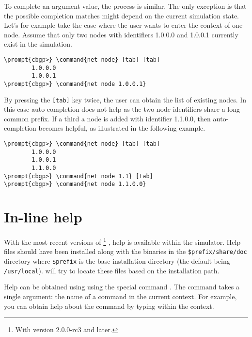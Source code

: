 To complete an argument value, the process is similar. The only
exception is that the possible completion matches might depend on the
current simulation state. Let's for example take the case where the
user wants to enter the context of one node. Assume that only two
nodes with identifiers 1.0.0.0 and 1.0.0.1 currently exist in the
simulation.

\begin{Verbatim}[commandchars=\\\{\}]
\prompt{cbgp>} \command{net node} [tab] [tab]
        1.0.0.0
        1.0.0.1
\prompt{cbgp>} \command{net node 1.0.0.1}
\end{Verbatim}

By pressing the \verb|[tab]| key twice, the user can
obtain the list of existing nodes. In this case auto-completion does
not help as the two node identifiers share a long common prefix. If a
third a node is added with identifier 1.1.0.0, then auto-completion
becomes helpful, as illustrated in the following example.

\begin{Verbatim}[commandchars=\\\{\}]
\prompt{cbgp>} \command{net node} [tab] [tab]
        1.0.0.0
        1.0.0.1
        1.1.0.0
\prompt{cbgp>} \command{net node 1.1} [tab]
\prompt{cbgp>} \command{net node 1.1.0.0}
\end{Verbatim}

\section{In-line help}
\label{sec:user-interface-help}

With the most recent versions of 
\footnote{With version 2.0.0-rc3 and later.}
, help is available within the simulator. Help files should have been
installed along with the binaries in the \verb|$prefix/share/doc|
directory where \verb|$prefix| is the base installation directory (the
default being \verb|/usr/local|).  will try to
locate these files based on the installation path.

Help can be obtained using using the special command
. The  command takes a single argument:
the name of a command in the current context. For example, you can
obtain help about the  command by typing
 within the  context.

